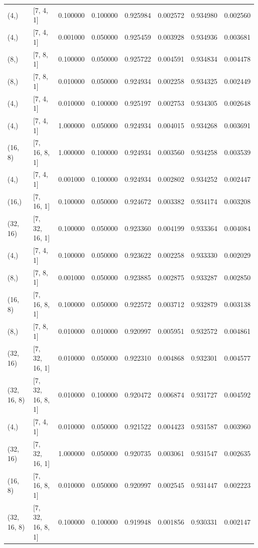 \documentclass{article}
\begin{document}
\begin{longtable}{llrrrrrr}
(4,) & [7, 4, 1] & 0.100000 & 0.100000 & 0.925984 & 0.002572 & 0.934980 & 0.002560 \\
(4,) & [7, 4, 1] & 0.001000 & 0.050000 & 0.925459 & 0.003928 & 0.934936 & 0.003681 \\
(8,) & [7, 8, 1] & 0.100000 & 0.050000 & 0.925722 & 0.004591 & 0.934834 & 0.004478 \\
(8,) & [7, 8, 1] & 0.010000 & 0.050000 & 0.924934 & 0.002258 & 0.934325 & 0.002449 \\
(4,) & [7, 4, 1] & 0.010000 & 0.100000 & 0.925197 & 0.002753 & 0.934305 & 0.002648 \\
(4,) & [7, 4, 1] & 1.000000 & 0.050000 & 0.924934 & 0.004015 & 0.934268 & 0.003691 \\
(16, 8) & [7, 16, 8, 1] & 1.000000 & 0.100000 & 0.924934 & 0.003560 & 0.934258 & 0.003539 \\
(4,) & [7, 4, 1] & 0.001000 & 0.100000 & 0.924934 & 0.002802 & 0.934252 & 0.002447 \\
(16,) & [7, 16, 1] & 0.100000 & 0.050000 & 0.924672 & 0.003382 & 0.934174 & 0.003208 \\
(32, 16) & [7, 32, 16, 1] & 0.100000 & 0.050000 & 0.923360 & 0.004199 & 0.933364 & 0.004084 \\
(4,) & [7, 4, 1] & 0.100000 & 0.050000 & 0.923622 & 0.002258 & 0.933330 & 0.002029 \\
(8,) & [7, 8, 1] & 0.001000 & 0.050000 & 0.923885 & 0.002875 & 0.933287 & 0.002850 \\
(16, 8) & [7, 16, 8, 1] & 0.100000 & 0.050000 & 0.922572 & 0.003712 & 0.932879 & 0.003138 \\
(8,) & [7, 8, 1] & 0.010000 & 0.010000 & 0.920997 & 0.005951 & 0.932572 & 0.004861 \\
(32, 16) & [7, 32, 16, 1] & 0.010000 & 0.050000 & 0.922310 & 0.004868 & 0.932301 & 0.004577 \\
(32, 16, 8) & [7, 32, 16, 8, 1] & 0.010000 & 0.100000 & 0.920472 & 0.006874 & 0.931727 & 0.004592 \\
(4,) & [7, 4, 1] & 0.010000 & 0.050000 & 0.921522 & 0.004423 & 0.931587 & 0.003960 \\
(32, 16) & [7, 32, 16, 1] & 1.000000 & 0.050000 & 0.920735 & 0.003061 & 0.931547 & 0.002635 \\
(16, 8) & [7, 16, 8, 1] & 0.010000 & 0.050000 & 0.920997 & 0.002545 & 0.931447 & 0.002223 \\
(32, 16, 8) & [7, 32, 16, 8, 1] & 0.100000 & 0.100000 & 0.919948 & 0.001856 & 0.930331 & 0.002147 \\

\end{longtable}
\end{document}
